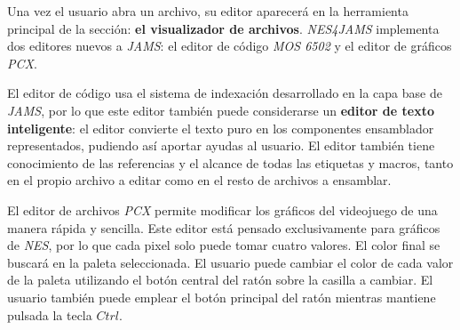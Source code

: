 Una vez el usuario abra un archivo, su editor aparecerá en la herramienta
principal de la sección: \textbf{el visualizador de archivos}.
\textit{NES4JAMS} implementa dos editores nuevos a \textit{JAMS}:
el editor de código \textit{MOS 6502} y el editor de gráficos \textit{PCX}.

El editor de código usa el sistema de indexación desarrollado
en la capa base de \textit{JAMS}, por lo que este editor también
puede considerarse un \textbf{editor de texto inteligente}:
el editor convierte el texto puro en los componentes ensamblador
representados, pudiendo así aportar ayudas al usuario.
El editor también tiene conocimiento de las referencias y el alcance de
todas las etiquetas y macros, tanto en el propio archivo a editar
como en el resto de archivos a ensamblar.

El editor de archivos \textit{PCX} permite modificar los
gráficos del videojuego de una manera rápida y sencilla.
Este editor está pensado exclusivamente para gráficos
de \textit{NES}, por lo que cada pixel solo puede tomar
cuatro valores.
El color final se buscará en la paleta seleccionada.
El usuario puede cambiar el color de cada valor de la
paleta utilizando el botón central del ratón sobre
la casilla a cambiar.
El usuario también puede emplear el botón principal
del ratón mientras mantiene pulsada la tecla $Ctrl$.

